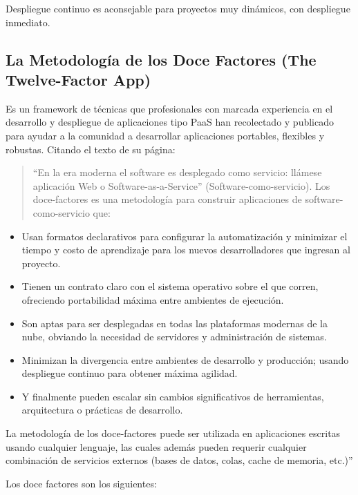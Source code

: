 \documentclass[conference]{IEEEtran}
\begin{document}
Despliegue continuo es aconsejable para proyectos muy dinámicos, con despliegue inmediato.

\subsection{La Metodología de los Doce Factores (The Twelve-Factor App)}

Es un framework de técnicas que profesionales con marcada experiencia en el desarrollo y despliegue de aplicaciones tipo PaaS han recolectado y publicado para ayudar a la comunidad a desarrollar aplicaciones portables, flexibles y robustas. Citando el texto de su página:

\begin{quote}
 “En la era moderna el software es desplegado como servicio: llámese aplicación Web o Software-as-a-Service” (Software-como-servicio). Los doce-factores es una metodología para construir aplicaciones de software-como-servicio que:
\end{quote}

\begin{itemize}
 \item Usan formatos declarativos para configurar la automatización y minimizar el tiempo y costo de aprendizaje para los nuevos desarrolladores que ingresan al proyecto.
 \item Tienen un contrato claro con el sistema operativo sobre el que corren, ofreciendo portabilidad máxima entre ambientes de ejecución.
 \item Son aptas para ser desplegadas en todas las plataformas modernas de la nube, obviando la necesidad de servidores y administración de sistemas.
 \item Minimizan la divergencia entre ambientes de desarrollo y producción; usando despliegue continuo para obtener máxima agilidad.
 \item Y finalmente pueden escalar sin cambios significativos de herramientas, arquitectura o prácticas de desarrollo.
\end{itemize}

La metodología de los doce-factores puede ser utilizada en aplicaciones escritas usando cualquier lenguaje, las cuales además pueden requerir cualquier combinación de servicios externos (bases de datos, colas, cache de memoria, etc.)”

Los doce factores son los siguientes:
\end{document}
